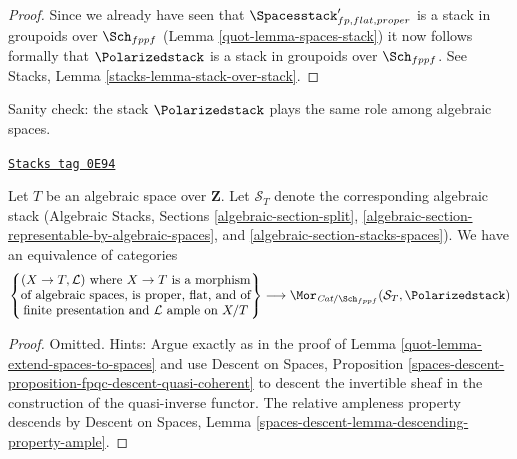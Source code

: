 \begin{proof}
\medskip\noindent
Since we already have seen that $\Spacesstack'_{fp, flat, proper}$
is a stack in groupoids over $\Sch_{fppf}$
(Lemma \ref{quot-lemma-spaces-stack}) it now follows formally
that $\Polarizedstack$ is a stack in groupoids over $\Sch_{fppf}$.
See Stacks, Lemma \ref{stacks-lemma-stack-over-stack}.
\end{proof}

Sanity check: the stack $\Polarizedstack$ plays
the same role among algebraic spaces.

\begin{lemma}
\label{quot-lemma-extend-polarized-to-spaces}
\href{https://stacks.math.columbia.edu/tag/0E94}{\texttt{Stacks tag 0E94}}

Let $T$ be an algebraic space over $\mathbf{Z}$. Let $\mathcal{S}_T$
denote the corresponding algebraic stack (Algebraic Stacks, Sections
\ref{algebraic-section-split},
\ref{algebraic-section-representable-by-algebraic-spaces}, and
\ref{algebraic-section-stacks-spaces}).
We have an equivalence of categories
$$
\left\{
\begin{matrix}
(X \to T, \mathcal{L})\text{ where }X \to T\text{ is a morphism}\\
\text{of algebraic spaces, is proper, flat, and of}\\
\text{finite presentation and }\mathcal{L}\text{ ample on }X/T
\end{matrix}
\right\}
\longrightarrow
\Mor_{\textit{Cat}/\Sch_{fppf}}(\mathcal{S}_T, \Polarizedstack)
$$
\end{lemma}

\begin{proof}

Omitted. Hints: Argue exactly as in the proof of
Lemma \ref{quot-lemma-extend-spaces-to-spaces} and use
Descent on Spaces, Proposition
\ref{spaces-descent-proposition-fpqc-descent-quasi-coherent}
to descent the invertible sheaf in the construction
of the quasi-inverse functor. The relative ampleness property descends
by Descent on Spaces, Lemma
\ref{spaces-descent-lemma-descending-property-ample}.
\end{proof}

